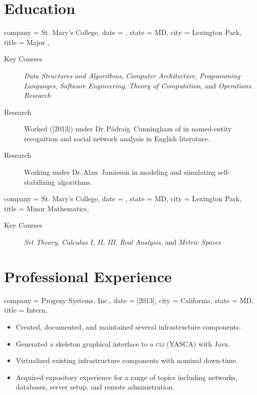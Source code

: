 \documentclass{bettercv}
\newcommand \course[1]   {\textit{#1}}
\begin{document}
\section{Education}
\begin{position}
  {
    company = St. Mary's College,
    date    = ,
    state   = MD,
    city    = Lexington Park,
    title   = Major ,
  }

\begin{description}
\item[Key Courses]
  \course{Data Structures and Algorithms},
  \course{Computer Architecture},
  \course{Programming Languages},
  \course{Software Engineering},
  \course{Theory of Computation},
  and \course{Operations Research}
\item[Research] Worked ([2013]) under
  Dr.\,P\'adraig~Cunningham of \ucd in named-entity recognition and
  social network analysis in English literature.
\item[Research] Working under Dr.\,Alan~Jamieson in modeling and
  simulating self-stabilizing algorithms.
\end{description}
\end{position}

\begin{position}
  {
    company = St. Mary's College,
    date    = ,
    state   = MD,
    city    = Lexington Park,
    title   = Minor \Dash Mathematics,
  }

  \begin{description}
  \item[Key Courses]
    \course{Set Theory},
    \course{Calculus I, II, III},
    \course{Real Analysis},
    and \course{Metric Spaces}
  \end{description}
\end{position}

\section{Professional Experience}


\begin{position}
  {
    company = {Progeny Systems, Inc.},
    date    = [2013],
    city    = California,
    state   = MD,
    title   = Intern,
  }

\begin{itemize}
\item Created, documented, and maintained several infrastructure components.
\item Generated a skeleton graphical interface to a \textsc{cli} (YASCA) with Java.
\item Virtualized existing infrastructure components with nominal down-time.
\item Acquired expository experience for a range of topics including
  networks,
  databases,
  server setup, and
  remote administration.
\end{itemize}
\end{position}
\end{document}
